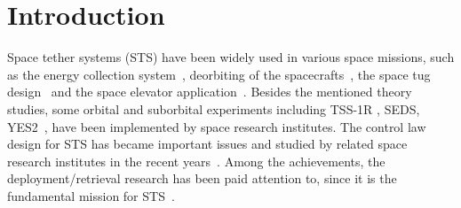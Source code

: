 \documentclass[conference]{IEEEtran}
\theoremstyle{plain}
\begin{document}
\section{Introduction}
Space tether systems (STS) have been widely used in various space missions, such as the energy collection system~\cite{lanoix2005effect}, deorbiting of the spacecrafts~\cite{khan2014analysis}, the space tug design~\cite{wen2016constrained} and the space elevator application~\cite{kojima2015mission}. Besides the mentioned theory studies, some orbital and suborbital experiments including TSS-1R \cite{lanoix2005effect}, SEDS, YES2~\cite{williams2012review}, have been implemented by space research institutes. The control law design for STS has became important issues and studied by related space research institutes in the recent years~\cite{zhu2011deorbiting,hallaj2015tethered,wang2015coordinated}. Among the achievements, the deployment/retrieval research has been paid attention to, since it is the fundamental mission for STS~\cite{zhu2015dynamic}.\par
\end{document}
